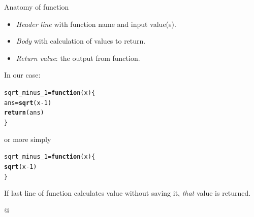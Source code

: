 \documentclass[unknownkeysallowed]{beamer}\usepackage[]{graphicx}\usepackage[]{color}
\makeatletter
\newcommand{\hlnum}[1]{\textcolor[rgb]{0.686,0.059,0.569}{#1}}%
\newcommand{\hlopt}[1]{\textcolor[rgb]{0,0,0}{#1}}%
\newcommand{\hlstd}[1]{\textcolor[rgb]{0.345,0.345,0.345}{#1}}%
\newcommand{\hlkwa}[1]{\textcolor[rgb]{0.161,0.373,0.58}{\textbf{#1}}}%
\newcommand{\hlkwb}[1]{\textcolor[rgb]{0.69,0.353,0.396}{#1}}%
\newcommand{\hlkwc}[1]{\textcolor[rgb]{0.333,0.667,0.333}{#1}}%
\newcommand{\hlkwd}[1]{\textcolor[rgb]{0.737,0.353,0.396}{\textbf{#1}}}%
\newenvironment{kframe}{%
 \def\at@end@of@kframe{}%
 \ifinner\ifhmode%
  \def\at@end@of@kframe{\end{minipage}}%
  \begin{minipage}{\columnwidth}%
 \fi\fi%
 \def\FrameCommand##1{\hskip\@totalleftmargin \hskip-\fboxsep
 \colorbox{shadecolor}{##1}\hskip-\fboxsep
     \hskip-\linewidth \hskip-\@totalleftmargin \hskip\columnwidth}%
 \MakeFramed {\advance\hsize-\width
   \@totalleftmargin\z@ \linewidth\hsize
   \@setminipage}}%
 {\par\unskip\endMakeFramed%
 \at@end@of@kframe}
\newenvironment{knitrout}{}{} %
\makeatother
\begin{document}
\begin{frame}[fragile]{Anatomy of function}
  
  \begin{itemize}
  \item \emph{Header line}  with function name and input value(s).
  \item \emph{Body} with calculation of values to return.
  \item \emph{Return value}: the output from function.
  \end{itemize}
  
  In our case:
  
\begin{knitrout}
\color{fgcolor}\begin{kframe}
\begin{alltt}
\hlstd{sqrt_minus_1}\hlkwb{=}\hlkwa{function}\hlstd{(}\hlkwc{x}\hlstd{) \{}
  \hlstd{ans}\hlkwb{=}\hlkwd{sqrt}\hlstd{(x}\hlopt{-}\hlnum{1}\hlstd{)}
  \hlkwd{return}\hlstd{(ans)}
\hlstd{\}}
\end{alltt}
\end{kframe}
\end{knitrout}

or more simply

\begin{knitrout}
\color{fgcolor}\begin{kframe}
\begin{alltt}
\hlstd{sqrt_minus_1}\hlkwb{=}\hlkwa{function}\hlstd{(}\hlkwc{x}\hlstd{) \{}
  \hlkwd{sqrt}\hlstd{(x}\hlopt{-}\hlnum{1}\hlstd{)}
\hlstd{\}}
\end{alltt}
\end{kframe}
\end{knitrout}

If last line of function calculates value without saving it,
\emph{that} value is returned.  

@ 
  
\end{frame}
\end{document}
